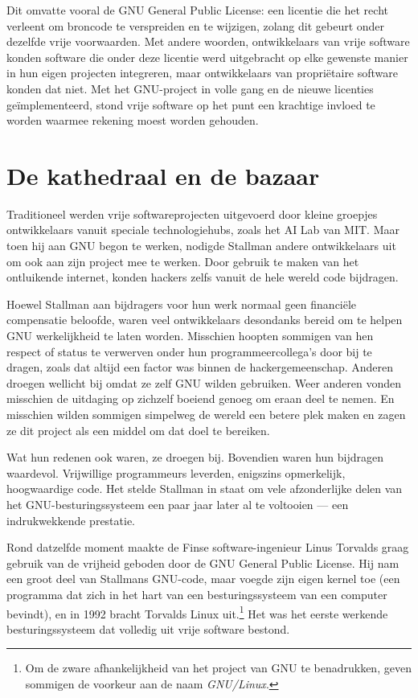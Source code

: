 \documentclass[
  a5paper,
  smalldemyvopaper,11pt,twoside,onecolumn,openright,extrafontsizes,
hidelinks]{memoir}
\begin{document}
Dit omvatte vooral de GNU General Public License: een licentie die het
recht verleent om broncode te verspreiden en te wijzigen, zolang dit
gebeurt onder dezelfde vrije voorwaarden. Met andere woorden,
ontwikkelaars van vrije software konden software die onder deze licentie
werd uitgebracht op elke gewenste manier in hun eigen projecten
integreren, maar ontwikkelaars van propriëtaire software konden dat
niet. Met het GNU-project in volle gang en de nieuwe licenties
geïmplementeerd, stond vrije software op het punt een krachtige invloed
te worden waarmee rekening moest worden gehouden.

\section{De kathedraal en de bazaar}\label{de-kathedraal-en-de-bazaar}

Traditioneel werden vrije softwareprojecten uitgevoerd door kleine
groepjes ontwikkelaars vanuit speciale technologiehubs, zoals het AI Lab
van MIT. Maar toen hij aan GNU begon te werken, nodigde Stallman andere
ontwikkelaars uit om ook aan zijn project mee te werken. Door gebruik te
maken van het ontluikende internet, konden hackers zelfs vanuit de hele
wereld code bijdragen.

Hoewel Stallman aan bijdragers voor hun werk normaal geen financiële
compensatie beloofde, waren veel ontwikkelaars desondanks bereid om te
helpen GNU werkelijkheid te laten worden. Misschien hoopten sommigen van
hen respect of status te verwerven onder hun programmeercollega's door
bij te dragen, zoals dat altijd een factor was binnen de
hackergemeenschap. Anderen droegen wellicht bij omdat ze zelf GNU wilden
gebruiken. Weer anderen vonden misschien de uitdaging op zichzelf
boeiend genoeg om eraan deel te nemen. En misschien wilden sommigen
simpelweg de wereld een betere plek maken en zagen ze dit project als
een middel om dat doel te bereiken.

Wat hun redenen ook waren, ze droegen bij. Bovendien waren hun bijdragen
waardevol. Vrijwillige programmeurs leverden, enigszins opmerkelijk,
hoogwaardige code. Het stelde Stallman in staat om vele afzonderlijke
delen van het GNU-besturingssysteem een paar jaar later al te voltooien
--- een indrukwekkende prestatie.

Rond datzelfde moment maakte de Finse software-ingenieur Linus Torvalds
graag gebruik van de vrijheid geboden door de GNU General Public
License. Hij nam een groot deel van Stallmans GNU-code, maar voegde zijn
eigen kernel toe (een programma dat zich in het hart van een
besturingssysteem van een computer bevindt), en in 1992 bracht Torvalds
Linux uit.\footnote{Om de zware afhankelijkheid van het project van GNU
  te benadrukken, geven sommigen de voorkeur aan de naam
  \emph{GNU/Linux}.} Het was het eerste werkende besturingssysteem dat
volledig uit vrije software bestond.
\end{document}

